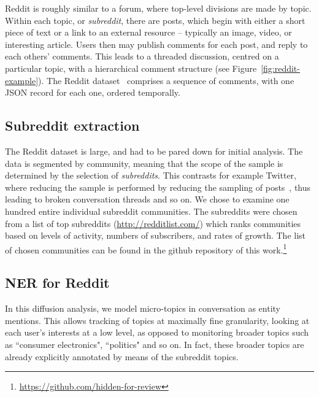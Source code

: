 \documentclass[sigconf,anonymous,review]{acmart}
\begin{document}
Reddit is roughly similar to a forum, where top-level divisions are made by topic.
Within each topic, or {\em subreddit}, there are posts, which begin with either a short piece of text or a link to an external resource -- typically an image, video, or interesting article.
Users then may publish comments for each post, and reply to each others' comments.
This leads to a threaded discussion, centred on a particular topic, with a hierarchical comment structure (see Figure~\ref{fig:reddit-example}).
The Reddit dataset~\cite{reddit-data} comprises a sequence of comments, with one JSON record for each one, ordered temporally.


\subsection{Subreddit extraction}

The Reddit dataset is large, and had to be pared down for initial analysis.
The data is segmented by community, meaning that the scope of the sample is determined by the selection of {\em subreddits}.
This contrasts for example Twitter, where reducing the sample is performed by reducing the sampling of posts~\cite{kergl2014endogenesis}, thus leading to broken conversation threads and so on.
We chose to examine one hundred entire individual subreddit communities.
The subreddits were chosen from a list of top subreddits (\url{http://redditlist.com/}) which ranks communities based on levels of activity, numbers of subscribers, and rates of growth.
The list of chosen communities can be found in the github repository of this work.\footnote{\url{https://github.com/hidden-for-review}}


\subsection{NER for Reddit}

In this diffusion analysis, we model micro-topics in conversation as entity mentions.
This allows tracking of topics at maximally fine granularity, looking at each user's interests at a low level, as opposed to monitoring broader topics such as ``consumer electronics", ``politics" and so on.
In fact, these broader topics are already explicitly annotated by means of the subreddit topics.
\end{document}

